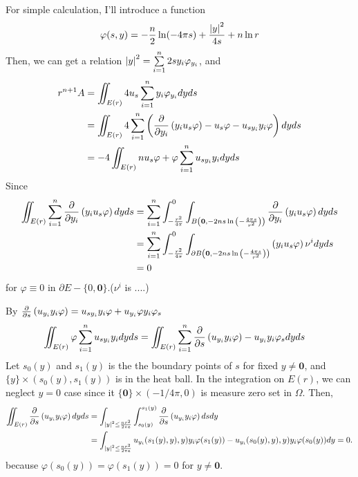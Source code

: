 \documentclass{article}
\begin{document}
For simple calculation, I'll introduce a function
\begin{equation*}
\varphi(s, y)= -\frac{n}{2}\ln(-4\pi s)+\frac{\abs{y}^2}{4s}+n\ln r
\end{equation*}
Then, we can get a relation $\abs{y}^2=\sum\limits_{i=1}^n 2sy_i\varphi_{y_i}$, and
\begin{equation*}
\begin{split}
r^{n+1}A&=\iint_{E(r)} 4u_s \sum\limits_{i=1}^n y_i \varphi_{y_i} dyds \\
&=\iint_{E(r)} 4 \sum\limits_{i=1}^n \left(\pdv{y_i}\left(y_iu_s\varphi\right)-u_s\varphi-u_{sy_i}y_i\varphi\right) dyds \\
&=-4\iint_{E(r)} nu_s\varphi + \varphi\sum\limits_{i=1}^n u_{sy_i} y_i  dyds
\end{split}
\end{equation*}
Since
\begin{equation*}
\begin{split}
\iint_{E(r)} \sum\limits_{i=1}^n \pdv{y_i}\left(y_i u_s\varphi\right) dyds&=\sum\limits_{i=1}^n \int_{-\frac{r^2}{4\pi}}^0 \int_{B\left(\bm{0}, -2ns \ln{\left(-\frac{4\pi s}{r^2}\right)}\right)}  \pdv{y_i}\left(y_i u_s\varphi\right) dyds \\
&=\sum\limits_{i=1}^n \int_{-\frac{r^2}{4\pi}}^0 \int_{\partial B\left(\bm{0}, -2ns \ln{\left(-\frac{4\pi s}{r^2}\right)}\right)}  \left(y_i u_s\varphi\right)\nu^i dyds \\
&=0
\end{split}
\end{equation*}
for $\varphi\equiv 0$ in $\partial E-\{0,\bm{0}\}$.($\nu^i$ is ....)

By $\pdv{s}\left(u_{y_i}y_i\varphi\right)=u_{sy_i}y_i\varphi+u_{y_i}\varphi y_i \varphi_s$ 
\begin{equation*}
\begin{split}
\iint_{E(r)} \varphi\sum\limits_{i=1}^n u_{sy_i} y_i  dyds&=\iint_{E(r)} \sum\limits_{i=1}^n \pdv{s}\left(u_{y_i}y_i\varphi\right) - u_{y_i}y_i \varphi_s dyds
\end{split}
\end{equation*}
Let $s_0(y)$ and $s_1(y)$ is the the boundary points of $s$ for fixed $y\neq \bm{0}$, and $\{y\}\times(s_0(y),s_1(y))$ is in the heat ball. In the integration on $E(r)$, we can neglect $y=0$ case since it $\{\bm{0}\}\times(-1/4\pi, 0)$ is measure zero set in $\Omega$. Then,
\begin{equation*}
\begin{split}
\iint_{E(r)}\pdv{s}\left(u_{y_i}y_i\varphi\right)dyds&=\int_{\abs{y}^2\leq\frac{nr^2}{2\pi e}}\int_{s_0(y)}^{s_1(y)}\pdv{s}\left(u_{y_i}y_i\varphi\right)dsdy \\
&=\int_{\abs{y}^2\leq\frac{nr^2}{2\pi e}}u_{y_i}(s_1(y), y), y)y_i\varphi(s_1(y))-u_{y_i}(s_0(y), y), y)y_i\varphi(s_0(y))dy=0.
\end{split}
\end{equation*}
because $\varphi(s_0(y))=\varphi(s_1(y))=0$ for $y\neq \bm{0}$.
\end{document}
